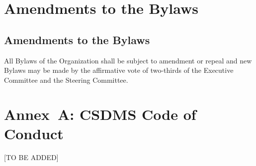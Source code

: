 \documentclass[11pt, oneside]{article}   	%
\def\article#1{
\renewcommand{\thesection}{Article \Roman{section}} 
\section[Article]{#1}
\renewcommand{\thesection}{\Roman{section}} 
}
\begin{document}
\article{Amendments to the Bylaws}

\subsection{Amendments to the Bylaws}

All Bylaws of the Organization shall be subject to amendment or repeal and new Bylaws may be made by the affirmative vote of two-thirds of the Executive Committee and the Steering Committee.




\newpage
\section*{Annex~A: CSDMS Code of Conduct}

[TO BE ADDED]
\end{document}
